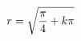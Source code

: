 \documentclass[preview]{standalone}
\begin{document}
\begin{align*}
\special{dvisvgm:raw <g id='unique000'>}r=\sqrt{\frac{\pi}{4}+k\pi}\special{dvisvgm:raw </g>}
\end{align*}
\end{document}
